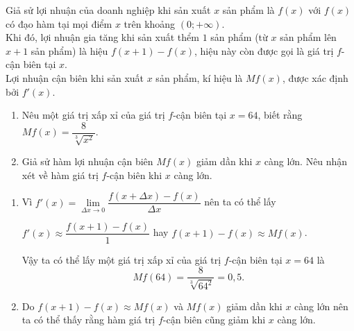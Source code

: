\begin{bt}%
	Giả sử lợi nhuận của doanh nghiệp khi sản xuất $x$ sản phẩm là $f(x)$ với $f(x)$ có đạo hàm tại mọi điểm $x$ trên khoảng $(0;+\infty)$. \\
	Khi đó, lợi nhuận gia tăng khi sản xuất thểm $1$ sản phẩm (từ $x$ sản phẩm lên $x+1$ sản phẩm) là hiệu $f(x+1)-f(x)$, hiệu này còn được gọi là giá trị $f$-cận biên tại $x$. \\
	Lợi nhuận cận biên khi sản xuất $x$ sản phẩm, kí hiệu là $Mf(x)$, được xác định bởi $f'(x)$.
	\begin{enumerate}
		\item Nêu một giá trị xấp xỉ của giá trị $f$-cận biên tại $x=64$, biết rằng $Mf(x)=\dfrac{8}{\sqrt[3]{x^2}}$.
		\item Giả sử hàm lợi nhuận cận biên $Mf(x)$ giảm dần khi $x$ càng lớn. Nêu nhận xét về hàm giá trị $f$-cận biên khi $x$ càng lớn.
	\end{enumerate}
	\loigiai
	{
		\begin{enumerate}
			\item
			Vì $f'(x)=\lim\limits_{\Delta x \to 0}\dfrac{f(x+\Delta x)-f(x)}{\Delta x}$ nên ta có thể lấy
			\begin{center}
				$f'(x)\approx\dfrac{f(x+1)-f(x)}{1}$ hay $f(x+1)-f(x)\approx Mf(x)$.
			\end{center}
			Vậy ta có thể lấy một giá trị xấp xỉ của giá trị $f$-cận biên tại $x=64$ là
			$$Mf(64)=\dfrac{8}{\sqrt[3]{64^2}}=0{,}5.$$
			\item
			Do $f(x+1)-f(x)\approx Mf(x)$ và $Mf(x)$ giảm dần khi $x$ càng lớn nên ta có thể thấy rằng hàm giá trị $f$-cận biên cũng giảm khi $x$ càng lớn.
		\end{enumerate}
	}
\end{bt}

